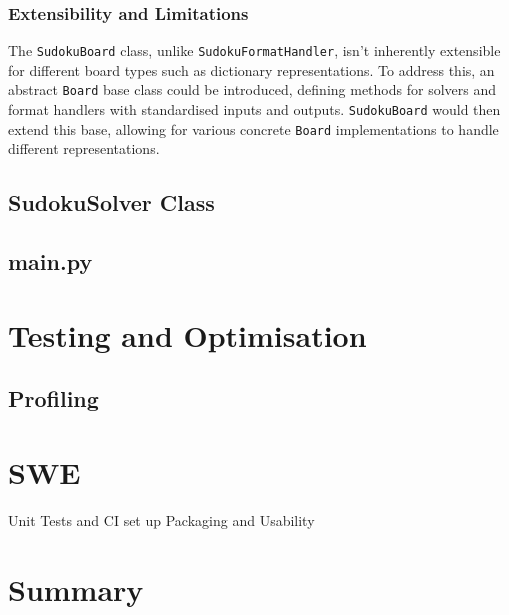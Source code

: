\documentclass[11pt]{article}
\begin{document}
\subsubsection{Extensibility and Limitations}
The \texttt{SudokuBoard} class, unlike \texttt{SudokuFormatHandler}, isn't inherently extensible for different board types such as dictionary representations. To address this, an abstract \texttt{Board} base class could be introduced, defining methods for solvers and format handlers with standardised inputs and outputs. \texttt{SudokuBoard} would then extend this base, allowing for various concrete \texttt{Board} implementations to handle different representations.
\subsection{SudokuSolver Class}

\subsection{main.py}

\section {Testing and Optimisation}
\subsection {Profiling}

\section {SWE}
Unit Tests and CI set up
Packaging and Usability

\section {Summary}


\end{document}
